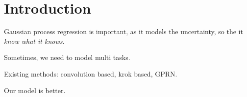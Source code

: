 \section{Introduction}

Gaussian process regression is important, as it models the uncertainty, so the it \emph{know what it knows}.

Sometimes, we need to model multi tasks.

Existing methods: convolution based, krok based, GPRN.

Our model is better.
